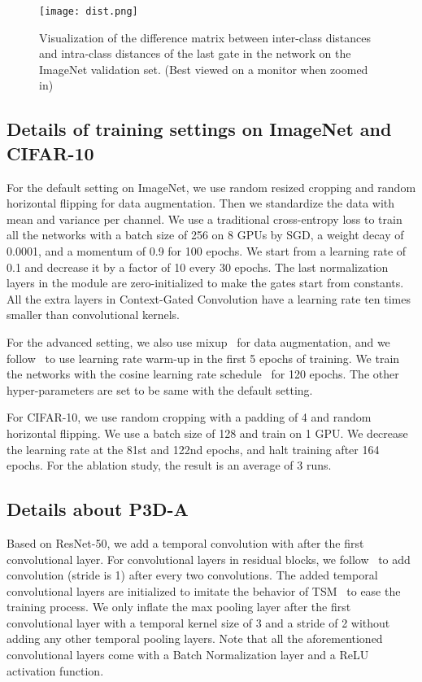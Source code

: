 \documentclass[runningheads]{llncs}
\begin{document}
\begin{figure*}[t]


\begin{center}
\texttt{[image: dist.png]}
\end{center}
\caption{Visualization of the difference matrix between inter-class distances and intra-class distances of the last gate in the network on the ImageNet validation set. (Best viewed on a monitor when zoomed in)}
\label{dist}
\end{figure*}

\subsection{Details of training settings on ImageNet and CIFAR-10}
\label{setting}
For the default setting on ImageNet, we use  random resized cropping and random horizontal flipping for data augmentation. Then we standardize the data with mean and variance per channel. We use a traditional cross-entropy loss to train all the networks with a batch size of 256 on 8 GPUs by SGD, a weight decay of 0.0001, and a momentum of 0.9 for 100 epochs. We start from a learning rate of 0.1 and decrease it by a factor of 10 every 30 epochs. The last normalization layers in the module are zero-initialized to make the gates start from constants. All the extra layers in Context-Gated Convolution have a learning rate ten times smaller than convolutional kernels.

For the advanced setting, we also use mixup~\cite{zhang2017mixup} for data augmentation, and we follow~\cite{he2019bag} to use learning rate warm-up in the first 5 epochs of training. We train the networks with the cosine learning rate schedule~\cite{he2019bag} for 120 epochs. The other hyper-parameters are set to be same with the default setting.

For CIFAR-10, we use  random cropping with a padding of 4 and random horizontal flipping. We use a batch size of 128 and train on 1 GPU. We decrease the learning rate at the 81st and 122nd epochs, and halt training after 164 epochs. 
For the ablation study, the result is an average of 3 runs.

\subsection{Details about P3D-A}
Based on ResNet-50, we add a temporal convolution with  after the first convolutional layer. For convolutional layers in residual blocks, we follow~\cite{wang2017non} to add  convolution (stride is 1) after every two  convolutions. The added temporal convolutional layers are initialized to imitate the behavior of TSM~\cite{lin2018temporal} to ease the training process. We only inflate the max pooling layer after the first convolutional layer with a temporal kernel size of 3 and a stride of 2 without adding any other temporal pooling layers. Note that all the aforementioned convolutional layers come with a Batch Normalization layer and a ReLU activation function.
\end{document}
